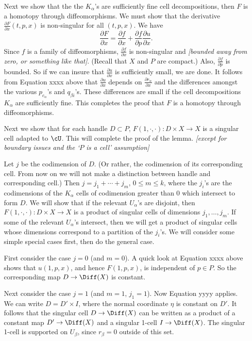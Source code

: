 \documentclass[11pt,leqno]{article}
\def\sub{\subset}
\def\pd#1#2{\frac{\partial #1}{\partial #2}}
\def\nn#1{{{\it \small [#1]}}}
\newcommand{\eq}[1]{\begin{displaymath}#1\end{displaymath}}
\begin{document}
Next we show that the the $K_\alpha$'s are sufficiently fine cell decompositions,
then $F$ is a homotopy through diffeomorphisms.
We must show that the derivative $\pd{F}{x}(t, p, x)$ is non-singular for all $(t, p, x)$.
We have
\eq{
	\pd{F}{x} = \pd{f}{x} + \pd{f}{p} \pd{u}{x} .
}
Since $f$ is a family of diffeomorphisms, $\pd{f}{x}$ is non-singular and
\nn{bounded away from zero, or something like that}.
(Recall that $X$ and $P$ are compact.)
Also, $\pd{f}{p}$ is bounded.
So if we can insure that $\pd{u}{x}$ is sufficiently small, we are done.
It follows from Equation xxxx above that $\pd{u}{x}$ depends on $\pd{r_\alpha}{x}$
and the differences amongst the various $p_{c_\alpha}$'s and $q_{\beta i}$'s.
These differences are small if the cell decompositions $K_\alpha$ are sufficiently fine.
This completes the proof that $F$ is a homotopy through diffeomorphisms.

\medskip

Next we show that for each handle $D \sub P$, $F(1, \cdot, \cdot) : D\times X \to X$
is a singular cell adapted to $\cU$.
This will complete the proof of the lemma.
\nn{except for boundary issues and the `$P$ is a cell' assumption}

Let $j$ be the codimension of $D$. 
(Or rather, the codimension of its corresponding cell.  From now on we will not make a distinction
between handle and corresponding cell.)
Then $j = j_1 + \cdots + j_m$, $0 \le m \le k$,
where the $j_i$'s are the codimensions of the $K_\alpha$
cells of codimension greater than 0 which intersect to form $D$.
We will show that
if the relevant $U_\alpha$'s are disjoint, then
$F(1, \cdot, \cdot) : D\times X \to X$
is a product of singular cells of dimensions $j_1, \ldots, j_m$.
If some of the relevant $U_\alpha$'s intersect, then we will get a product of singular
cells whose dimensions correspond to a partition of the $j_i$'s.
We will consider some simple special cases first, then do the general case.

First consider the case $j=0$ (and $m=0$).
A quick look at Equation xxxx above shows that $u(1, p, x)$, and hence $F(1, p, x)$,
is independent of $p \in P$.
So the corresponding map $D \to \Diff(X)$ is constant.

Next consider the case $j = 1$ (and $m=1$, $j_1=1$).
Now Equation yyyy applies.
We can write $D = D'\times I$, where the normal coordinate $\eta$ is constant on $D'$.
It follows that the singular cell $D \to \Diff(X)$ can be written as a product
of a constant map $D' \to \Diff(X)$ and a singular 1-cell $I \to \Diff(X)$.
The singular 1-cell is supported on $U_\beta$, since $r_\beta = 0$ outside of this set.
\end{document}
